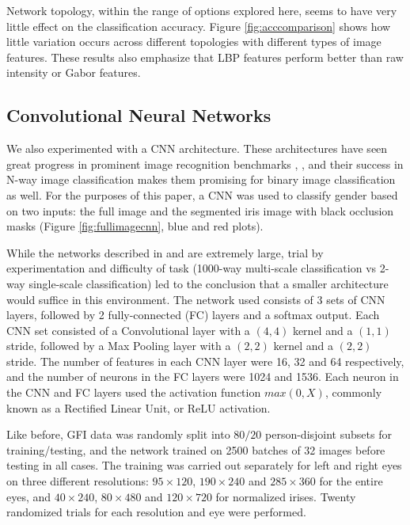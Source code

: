 \documentclass[10pt,twocolumn,letterpaper]{article}
\begin{document}
Network topology, within the range of options explored here, seems to have very little effect on the classification accuracy. 
Figure \ref{fig:acccomparison} shows how little variation occurs across different topologies with different types of image features.
These results also emphasize that LBP features perform better than raw intensity or Gabor features.

\subsection{Convolutional Neural Networks}
\label{subcnn}

We also experimented with a CNN architecture. These architectures have seen great progress in prominent image recognition benchmarks \cite{VGG}, \cite{googlenet}, and their success in N-way image classification makes them  promising for binary image classification as well. For the purposes of this paper, a CNN was used to classify gender based on two inputs: the full image and the segmented iris image with black occlusion masks (Figure \ref{fig:fullimagecnn}, blue and red plots). 

While the networks described in \cite{VGG} and \cite{googlenet} are extremely large, trial by experimentation and difficulty of task (1000-way multi-scale classification vs 2-way single-scale classification) led to the conclusion that a smaller architecture would suffice in this environment. The network used consists of 3 sets of CNN layers, followed by 2 fully-connected (FC) layers and a softmax output. Each CNN set consisted of a Convolutional layer with a $(4,4)$ kernel and a $(1,1)$ stride, followed by a Max Pooling layer with a $(2,2)$ kernel and a $(2,2)$ stride. The number of features in each CNN layer were 16, 32 and 64 respectively, and the number of neurons in the FC layers were 1024 and 1536. Each neuron in the CNN and FC layers used the activation function $max(0,X)$, commonly known as a Rectified Linear Unit, or ReLU activation. 

Like before, GFI data was randomly split into $80/20$ person-disjoint subsets for training/testing, and the network trained on 2500 batches of 32 images before testing in all cases. 
The training was carried out separately for left and right eyes on three different resolutions: $95\times120$, $190\times240$ and $285\times360$ for the entire eyes, and $40\times240$, $80\times480$ and $120\times720$ for normalized irises. 
Twenty randomized trials for each resolution and eye were performed.
\end{document}
